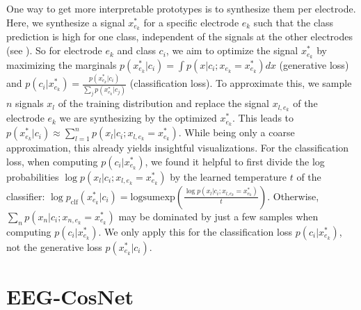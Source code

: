     One way to get more interpretable prototypes is to synthesize them per
electrode. Here, we synthesize a signal $x^*_{e_k}$ for a specific
electrode $e_k$ such that the class prediction is high for one class,
independent of the signals at the other electrodes (see
). So for
electrode $e_k$ and class $c_i$, we aim to optimize the signal
$x^*_{e_k}$ by maximizing the marginals
$p(x^*_{e_k}|c_i)=\int p(x|c_i;x_{e_k}=x^*_{e_k}) dx$ (generative
loss) and
$p(c_i|x^*_{e_k})=\frac{p(x^*_{e_k}|c_i)}{\sum_j p(x^*_{e_k}|c_j)}$
(classification loss). To approximate this, we sample $n$ signals
$x_l$ of the training distribution and replace the signal
$x_{l,e_k}$ of the electrode $e_k$ we are synthesizing by the
optimized $x^*_{e_k}$. This leads to
$p(x^*_{e_k}|c_i)\approx\sum_{l=1}^n p(x_l|c_i;x_{l,e_k}=x^*_{e_k})$.
While being only a coarse approximation, this already yields insightful
visualizations. For the classification loss, when computing
$p(c_i|x^*_{e_k})$, we found it helpful to first divide the log
probabilities $\log p(x_l|c_i;x_{l,e_k}=x^*_{e_k})$ by the learned
temperature $t$ of the classifier:
$\log p_\mathrm{clf}(x^*_{e_k}|c_i)=\mathrm{logsumexp}\left(\frac{\log p(x_l|c_i;x_{l,e_k}=x^*_{e_k})}{t}\right)$.
Otherwise, $\sum_n p(x_n|c_i;x_{n,e_k}=x^*_{e_k})$ may be dominated by
just a few samples when computing $p(c_i|x^*_{e_k})$. We only apply
this for the classification loss $p(c_i|x^*_{e_k})$, not the
generative loss $p(x^*_{e_k}|c_i)$.

\section{EEG-CosNet}\label{methods-eeg-cosnet}
    

